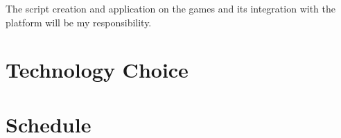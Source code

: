 The script creation and application on the games and its integration with the
platform will be my responsibility.






\section[Technology Choice]{Technology Choice}


\section[Schedule]{Schedule}
